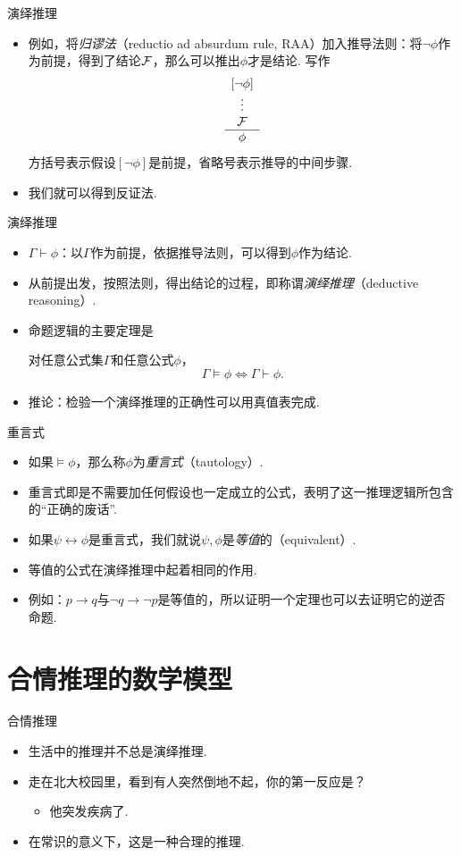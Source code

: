 {演绎推理}
\begin{itemize}
    \item 例如，将\emph{归谬法}（reductio ad absurdum rule, RAA）加入推导法则：将$\neg\phi$作为前提，得到了结论$\mathcal{F}$，那么可以推出$\phi$才是结论. 写作
    \[\begin{array}{c}
         [\neg\phi]  \\
         \vdots\\
         \mathcal{F}\\\hline
         \phi
    \end{array}\]
    方括号表示假设$[\neg\phi]$是前提，省略号表示推导的中间步骤.
    \item 我们就可以得到反证法. 
\end{itemize}


{演绎推理}
\begin{itemize}
    \item $\Gamma\vdash\phi$：以$\Gamma$作为前提，依据推导法则，可以得到$\phi$作为结论.
    \item 从前提出发，按照法则，得出结论的过程，即称谓\emph{演绎推理}（deductive reasoning）.
    \item 命题逻辑的主要定理是
    \begin{theorem}
        对任意公式集$\Gamma$和任意公式$\phi$，
        \[\Gamma\models\phi\iff\Gamma\vdash\phi.\]
    \end{theorem}
    \item 推论：检验一个演绎推理的正确性可以用真值表完成.
\end{itemize}


{重言式}
\begin{itemize}
    \item 如果$\models \phi$，那么称$\phi$为\emph{重言式}（tautology）.
    \item 重言式即是不需要加任何假设也一定成立的公式，表明了这一推理逻辑所包含的``正确的废话''.
    \item 如果$\psi\leftrightarrow\phi$是重言式，我们就说$\psi,\phi$是\emph{等值}的（equivalent）.
    \item 等值的公式在演绎推理中起着相同的作用.
    \item 例如：$p\to q$与$\neg q\to\neg p$是等值的，所以证明一个定理也可以去证明它的逆否命题.
\end{itemize}


\section{合情推理的数学模型}
{合情推理}
\begin{itemize}
    \item 生活中的推理并不总是演绎推理.
    \item 走在北大校园里，看到有人突然倒地不起，你的第一反应是？
    \begin{itemize}
        \item 他突发疾病了.
    \end{itemize}
    \item 在常识的意义下，这是一种合理的推理.
\end{itemize}


